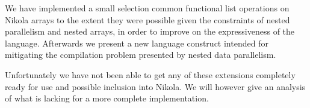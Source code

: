 
We have implemented a small selection common functional list operations on
Nikola arrays to the extent they were possible given the constraints of nested
parallelism and nested arrays, in order to improve on the expressiveness of the
language. Afterwards we present a new language construct intended for
mitigating the compilation problem presented by nested data parallelism.

Unfortunately we have not been able to get any of these extensions completely
ready for use and possible inclusion into Nikola. We will however give an
analysis of what is lacking for a more complete implementation.

